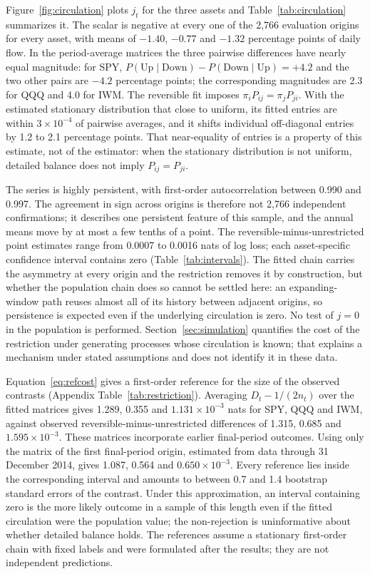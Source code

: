 Figure~\ref{fig:circulation} plots $j_t$ for the three assets and Table~\ref{tab:circulation} summarizes it. The scalar is negative at every one of the 2,766 evaluation origins for every asset, with means of $-1.40$, $-0.77$ and $-1.32$ percentage points of daily flow. In the period-average matrices the three pairwise differences have nearly equal magnitude: for SPY, $P(\text{Up}\mid\text{Down})-P(\text{Down}\mid\text{Up})=+4.2$ and the two other pairs are $-4.2$ percentage points; the corresponding magnitudes are 2.3 for QQQ and 4.0 for IWM. The reversible fit imposes $\pi_iP_{ij}=\pi_jP_{ji}$. With the estimated stationary distribution that close to uniform, its fitted entries are within $3\times10^{-4}$ of pairwise averages, and it shifts individual off-diagonal entries by 1.2 to 2.1 percentage points. That near-equality of entries is a property of this estimate, not of the estimator: when the stationary distribution is not uniform, detailed balance does not imply $P_{ij}=P_{ji}$.

The series is highly persistent, with first-order autocorrelation between 0.990 and 0.997. The agreement in sign across origins is therefore not 2,766 independent confirmations; it describes one persistent feature of this sample, and the annual means move by at most a few tenths of a point. The reversible-minus-unrestricted point estimates range from 0.0007 to 0.0016 nats of log loss; each asset-specific confidence interval contains zero (Table~\ref{tab:intervals}). The fitted chain carries the asymmetry at every origin and the restriction removes it by construction, but whether the population chain does so cannot be settled here: an expanding-window path reuses almost all of its history between adjacent origins, so persistence is expected even if the underlying circulation is zero. No test of $j=0$ in the population is performed. Section~\ref{sec:simulation} quantifies the cost of the restriction under generating processes whose circulation is known; that explains a mechanism under stated assumptions and does not identify it in these data.

Equation~\eqref{eq:refcost} gives a first-order reference for the size of the observed contrasts (Appendix Table~\ref{tab:restriction}). Averaging $D_t-1/(2n_t)$ over the fitted matrices gives 1.289, 0.355 and $1.131\times10^{-3}$ nats for SPY, QQQ and IWM, against observed reversible-minus-unrestricted differences of 1.315, 0.685 and $1.595\times10^{-3}$. These matrices incorporate earlier final-period outcomes. Using only the matrix of the first final-period origin, estimated from data through 31 December 2014, gives 1.087, 0.564 and $0.650\times10^{-3}$. Every reference lies inside the corresponding interval and amounts to between 0.7 and 1.4 bootstrap standard errors of the contrast. Under this approximation, an interval containing zero is the more likely outcome in a sample of this length even if the fitted circulation were the population value; the non-rejection is uninformative about whether detailed balance holds. The references assume a stationary first-order chain with fixed labels and were formulated after the results; they are not independent predictions.

